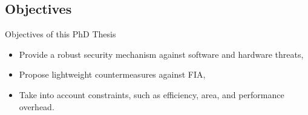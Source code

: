 \subsection{Objectives}
\begin{frame}{Objectives of this PhD Thesis}
    \begin{block}{}
        \begin{itemize}
            [triangle]
            \justifying
            \item Provide a robust security mechanism against software and hardware threats,
            \item Propose lightweight countermeasures against FIA,
            \item Take into account constraints, such as efficiency, area, and performance overhead.
        \end{itemize}
    \end{block}
\end{frame}
